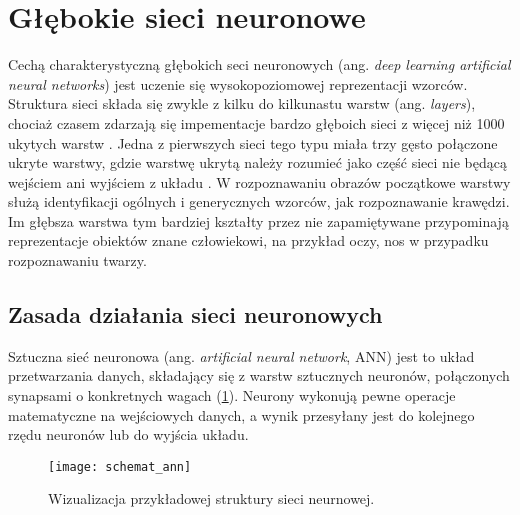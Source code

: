 \section{Głębokie sieci neuronowe}

Cechą charakterystyczną głębokich seci neuronowych (ang. \textit{deep learning artificial neural networks}) jest uczenie się wysokopoziomowej reprezentacji wzorców. Struktura sieci składa się zwykle z kilku do kilkunastu warstw (ang. \textit{layers}), chociaż czasem zdarzają się impementacje bardzo głęboich sieci z więcej niż 1000 ukytych warstw \cite{He2015DeepRL}. Jedna z pierwszych sieci tego typu miała trzy gęsto połączone ukryte warstwy, gdzie warstwę ukrytą należy rozumieć jako część sieci nie będącą wejściem ani wyjściem z układu \cite{Hinton2006AFL}. W rozpoznawaniu obrazów początkowe warstwy służą identyfikacji ogólnych i generycznych wzorców, jak rozpoznawanie krawędzi. Im głębsza warstwa tym bardziej kształty przez nie zapamiętywane przypominają reprezentacje obiektów znane człowiekowi, na przykład oczy, nos w przypadku rozpoznawaniu twarzy.

\subsection{Zasada działania sieci neuronowych}
Sztuczna sieć neuronowa (ang. \textit{artificial neural network}, ANN) jest to układ przetwarzania danych, składający się z warstw sztucznych neuronów, połączonych synapsami o konkretnych wagach (\ref{fig:ann_visualisation}). Neurony wykonują pewne operacje matematyczne na wejściowych danych, a wynik przesyłany jest do kolejnego rzędu neuronów lub do wyjścia układu. 

\begin{figure}[h]
	\centering
	\centering
		\texttt{[image: schemat\_ann]}	
	\caption{Wizualizacja przykładowej struktury sieci neurnowej.}
	\label{fig:ann_visualisation}
\end{figure}

